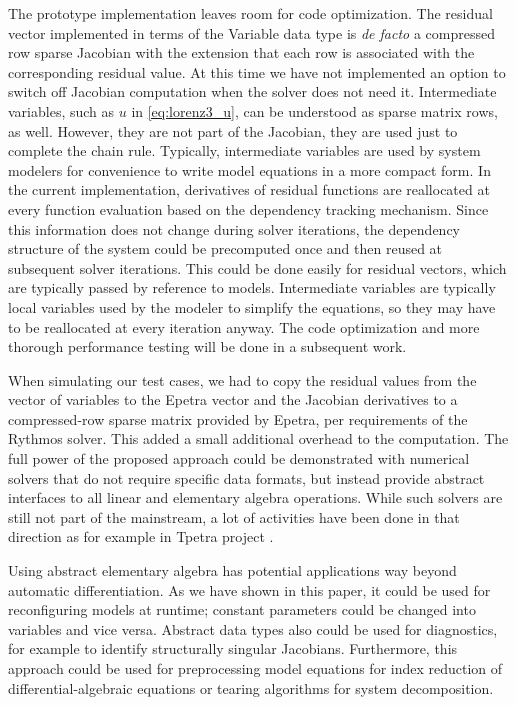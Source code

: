 \documentclass[10pt]{ijnam}
\theoremstyle{definition}
\begin{document}
The prototype implementation leaves room for code optimization. The 
residual vector implemented in terms of the Variable data type is \textit{de facto}
a compressed row sparse Jacobian with the extension that each row
is associated with the corresponding residual value. 
At this time we have not implemented an option to switch off Jacobian computation
when the solver does not need it.
Intermediate variables, such as
$u$ in \eqref{eq:lorenz3_u}, can be understood as sparse matrix rows, as well. 
However, they are not part of the Jacobian, they are used just to complete the 
chain rule. Typically, intermediate variables are used by system modelers 
for convenience to write model equations in a more compact form. In the current 
implementation, derivatives of residual functions are reallocated at every 
function evaluation based on the dependency tracking mechanism. Since this information
does not change during solver iterations, the dependency structure of the system 
could be precomputed once and then reused at subsequent solver iterations.
This could be done easily for residual vectors, which are typically passed by 
reference to models. Intermediate variables are typically local variables used by
the modeler to simplify the equations, so they may have to be reallocated at every 
iteration anyway. The code optimization and more thorough performance testing will be 
done in a subsequent work.

When simulating our test cases, we had to copy the residual values from the 
vector of variables to the Epetra vector and the Jacobian derivatives to a
compressed-row sparse matrix provided by Epetra, per requirements of the Rythmos solver.
This added a small additional overhead to the computation. The full power
of the proposed approach could be demonstrated with numerical solvers that 
do not require specific data formats, but instead provide abstract interfaces 
to all linear and elementary algebra operations. While such solvers are 
still not part of the mainstream, a lot of activities have been done in that 
direction as for example in Tpetra project \cite{baker2012}.

Using abstract elementary algebra has potential applications way beyond 
automatic differentiation. As we have shown in this paper, it could be 
used for reconfiguring models at runtime; constant parameters could be 
changed into variables and vice versa. Abstract data types also 
could be used for diagnostics, for example to identify structurally singular 
Jacobians. Furthermore, this approach could be used for preprocessing 
model equations for index reduction of differential-algebraic equations or 
tearing algorithms for system decomposition. 
\end{document}

